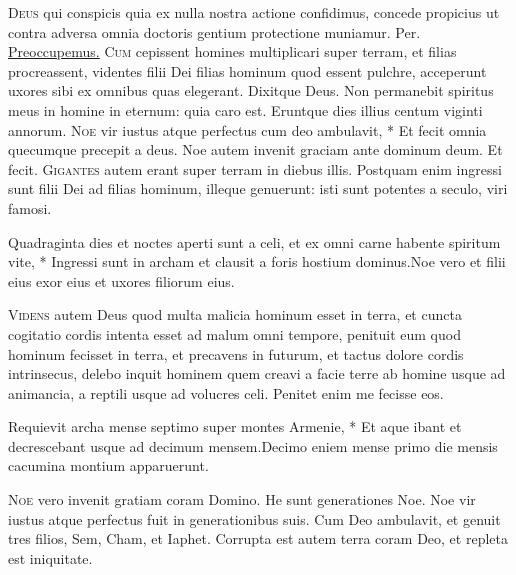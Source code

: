 \begin{multicols*}{2}
\lettrine[lines=2]{\zallmancaps \color{Blue} D}{eus} qui conspicis quia ex nulla nostra actione confidimus, concede propicius ut contra adversa omnia doctoris gentium protectione muniamur. Per.
 \hyperlink{preoccupemus-faciem-invitatorium}{Preoccupemus.}
\lettrine[lines=2]{\zallmancaps \color{Red} C}{um} cepissent homines multiplicari super terram, et filias procreassent, videntes filii Dei filias hominum quod essent pulchre, acceperunt uxores sibi ex omnibus quas elegerant. Dixitque Deus. Non permanebit spiritus meus in homine in eternum: quia caro est. Eruntque dies illius centum viginti annorum. \R
\lettrine[lines=2]{\zallmancaps \color{Blue} N}{oe} \hypertarget{noe-vir-iustus}{\label{noe-vir-iustus}} vir iustus atque perfectus cum deo ambulavit, * Et fecit omnia quecumque precepit a deus. \V Noe autem invenit graciam ante dominum deum. Et fecit.
\lettrine[lines=2]{\zallmancaps \color{Red} G}{igantes} autem erant super terram in diebus illis. Postquam enim ingressi sunt filii Dei ad filias hominum, illeque genuerunt: isti sunt potentes a seculo, viri famosi.
\begin{responsory}
{Quadraginta dies et noctes aperti sunt a celi, et ex omni carne habente spiritum vite, * Ingressi sunt in archam et clausit a foris hostium dominus.}{Noe vero et filii eius exor eius et uxores filiorum eius.}
\end{responsory}
\lettrine[lines=2]{\zallmancaps \color{Blue} V}{idens} autem Deus quod multa malicia hominum esset in terra, et cuncta cogitatio cordis intenta esset ad malum omni tempore, penituit eum quod hominum fecisset in terra, et precavens in futurum, et tactus dolore cordis intrinsecus, delebo inquit hominem quem creavi a facie terre ab homine usque ad animancia, a reptili usque ad volucres celi. Penitet enim me fecisse eos.
\begin{responsory-doxology}
{Requievit archa mense septimo super montes Armenie, * Et aque ibant et decrescebant usque ad decimum mensem.}{Decimo eniem mense primo die mensis cacumina montium apparuerunt.}
\end{responsory-doxology}
\lettrine[lines=2]{\zallmancaps \color{Red} N}{oe} vero invenit gratiam coram Domino. He sunt generationes Noe. Noe vir iustus atque perfectus fuit in generationibus suis. Cum Deo ambulavit, et genuit tres filios, Sem, Cham, et Iaphet. Corrupta est autem terra coram Deo, et repleta est iniquitate.

\end{multicols*}
